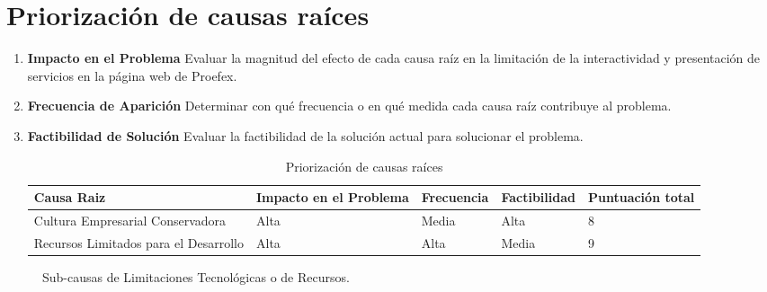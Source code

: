 \section{Priorización de causas raíces}

\begin{enumerate}
\item \textbf{Impacto en el Problema}
Evaluar la magnitud del efecto de cada causa raíz en la limitación de la interactividad
y presentación de servicios en la página web de Proefex.

\item \textbf{Frecuencia de Aparición}
Determinar con qué frecuencia o en qué medida cada causa raíz contribuye al problema.

\item \textbf{Factibilidad de Solución}
Evaluar la factibilidad de la solución actual para solucionar el problema.

\begin{table}[!ht]
\begin{center}
\begin{tabular}{| p{5cm} | p{3cm} | p{2cm} | p{2cm} | p{2cm} | }
\hline
Causa Raiz & Impacto en el Problema & Frecuencia & Factibilidad & Puntuación total \\ \hline
Cultura Empresarial Conservadora & Alta & Media & Alta & 8 \\ \hline
Recursos Limitados para el Desarrollo & Alta & Alta & Media & 9 \\ \hline
\end{tabular}

\caption{Priorización de causas raíces}
\label{tab:causasraiz}
\end{center}
\end{table} 
\end{enumerate}

\begin{figure}[ht]
  \centering
  \caption{Sub-causas de Limitaciones Tecnológicas o de Recursos.}
\end{figure}

